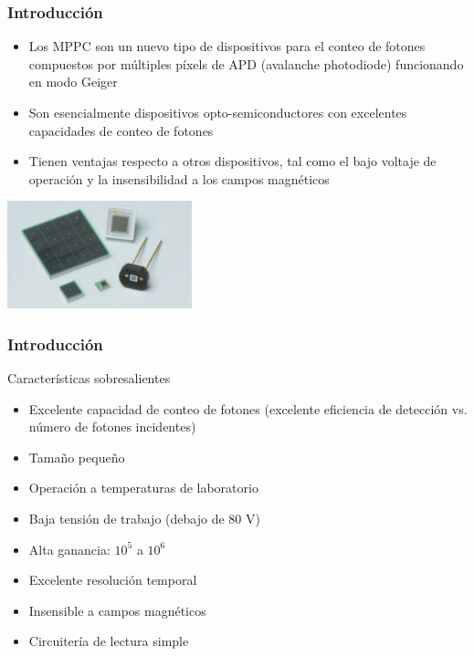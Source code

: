 \documentclass{beamer}
\begin{document}
\begin{frame}
\frametitle{Introducción}
\begin{block}{}
\begin{itemize}
\item Los MPPC son un nuevo tipo de dispositivos para el conteo de fotones
compuestos por múltiples píxels de APD (avalanche
photodiode) funcionando en modo Geiger
\item Son esencialmente dispositivos opto-semiconductores con excelentes
capacidades de conteo de fotones
\item Tienen ventajas respecto a otros dispositivos, tal como el bajo voltaje de
operación y la insensibilidad a los campos magnéticos 
\end{itemize}
\end{block}
\begin{center}
\includegraphics[width=0.4\textwidth]{d1/sipm_varios}
\end{center}
\end{frame}

\begin{frame}
\frametitle{Introducción}
\begin{block}{Características sobresalientes}
\begin{itemize}
\item Excelente capacidad de conteo de fotones (excelente eficiencia de
detección vs. número de fotones incidentes)
\item Tamaño pequeño
\item Operación a temperaturas de laboratorio
\item Baja tensión de trabajo (debajo de 80 V)
\item Alta ganancia: $10^5$ a $10^6$
\item Excelente resolución temporal
\item Insensible a campos magnéticos
\item Circuitería de lectura simple
\end{itemize}
\end{block}
\end{frame}
\end{document}
